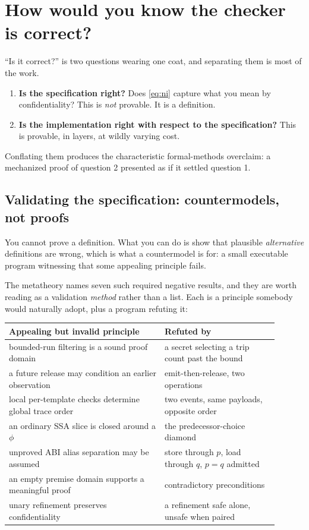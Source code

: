 \section{How would you know the checker is correct?}
\label{part:correctness}

``Is it correct?'' is two questions wearing one coat, and separating them is most
of the work.

\begin{enumerate}[leftmargin=1.6em]
\item \textbf{Is the specification right?} Does \eqref{eq:ni} capture what you
      mean by confidentiality? This is \emph{not} provable. It is a definition.
\item \textbf{Is the implementation right with respect to the specification?}
      This is provable, in layers, at wildly varying cost.
\end{enumerate}

Conflating them produces the characteristic formal-methods overclaim: a
mechanized proof of question 2 presented as if it settled question 1.

\subsection{Validating the specification: countermodels, not proofs}

You cannot prove a definition. What you can do is show that plausible
\emph{alternative} definitions are wrong, which is what a countermodel is for: a
small executable program witnessing that some appealing principle fails.

The metatheory names seven such required negative results, and they are worth
reading as a validation \emph{method} rather than a list. Each is a principle
somebody would naturally adopt, plus a program refuting it:

\begin{center}
\begin{tabular}{@{}p{0.52\linewidth} p{0.38\linewidth}@{}}
\toprule
Appealing but invalid principle & Refuted by \\
\midrule
bounded-run filtering is a sound proof domain
  & a secret selecting a trip count past the bound \\[2pt]
a future release may condition an earlier observation
  & emit-then-release, two operations \\[2pt]
local per-template checks determine global trace order
  & two events, same payloads, opposite order \\[2pt]
an ordinary SSA slice is closed around a $\phi$
  & the predecessor-choice diamond \\[2pt]
unproved ABI alias separation may be assumed
  & store through $p$, load through $q$, $p=q$ admitted \\[2pt]
an empty premise domain supports a meaningful proof
  & contradictory preconditions \\[2pt]
unary refinement preserves confidentiality
  & a refinement safe alone, unsafe when paired \\
\bottomrule
\end{tabular}
\end{center}

